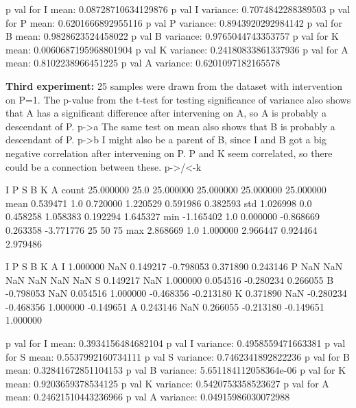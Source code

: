 \documentclass[12pt,fleqn,]{article}
\begin{document}
\begin{multicols}{2}
p val for I mean: 0.08728710634129876
p val I variance: 0.7074842288389503
p val for P mean: 0.6201666892955116
p val P variance: 0.8943920292984142
p val for B mean: 0.9828623524458022
p val B variance: 0.9765044743353757
p val for K mean: 0.0060687195968801904
p val K variance: 0.24180833861337936
p val for A mean: 0.8102238966451225
p val A variance: 0.6201097182165578


\textbf{Third experiment:} 25 samples were drawn from the dataset with intervention on P=1. 
The p-value from the t-test for testing significance of variance also shows that A has a significant difference after intervening on A, so A is probably a descendant of P. 
p->a
The same test on mean also shows that B is probably a descendant of P. 
p->b
I might also be a parent of B, since I and B got a big negative correlation after intervening on P.
P and K seem correlated, so there could be a connection between these.
p->/<-k

            I     P          S          B          K          A
count  25.000000  25.0  25.000000  25.000000  25.000000  25.000000
mean    0.539471   1.0   0.720000   1.220529   0.591986   0.382593
std     1.026998   0.0   0.458258   1.058383   0.192294   1.645327
min    -1.165402   1.0   0.000000  -0.868669   0.263358  -3.771776
25%
50%
75%
max     2.868669   1.0   1.000000   2.966447   0.924464   2.979486

          I   P         S         B         K         A
I  1.000000 NaN  0.149217 -0.798053  0.371890  0.243146
P       NaN NaN       NaN       NaN       NaN       NaN
S  0.149217 NaN  1.000000  0.054516 -0.280234  0.266055
B -0.798053 NaN  0.054516  1.000000 -0.468356 -0.213180
K  0.371890 NaN -0.280234 -0.468356  1.000000 -0.149651
A  0.243146 NaN  0.266055 -0.213180 -0.149651  1.000000

p val for I mean: 0.3934156484682104
p val I variance: 0.4958559471663381
p val for S mean: 0.5537992160734111
p val S variance: 0.7462341892822236
p val for B mean: 0.32841672851104153
p val B variance: 5.651184112058364e-06
p val for K mean: 0.9203659378534125
p val K variance: 0.5420753358523627
p val for A mean: 0.24621510443236966
p val A variance: 0.04915986030072988




\end{multicols}		
\end{document}
